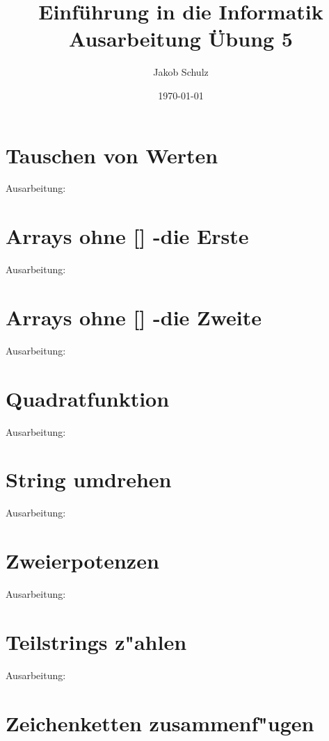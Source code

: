\documentclass[a4paper,11pt,titlepage]{article}
\begin{document}
\title{Einf\"uhrung in die Informatik\\
Ausarbeitung \"Ubung 5}


\author{Jakob Schulz}


\date{\today}

\maketitle{\thispagestyle{plain}}

\section{Tauschen von Werten}
Ausarbeitung:
\newpage
\section{Arrays ohne [] -die Erste}
Ausarbeitung:
\newpage
\section{Arrays ohne [] -die Zweite}
Ausarbeitung:
\newpage
\section{Quadratfunktion}
Ausarbeitung:
\newpage
\section{String umdrehen}
Ausarbeitung:
\newpage
\section{Zweierpotenzen}
Ausarbeitung:
\newpage
\section{Teilstrings z"ahlen}
Ausarbeitung:
\newpage
\section{Zeichenketten zusammenf"ugen}
\end{document}
